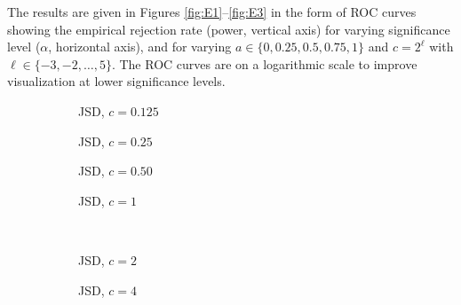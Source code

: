 \documentclass[oneside,11pt]{article}
\begin{document}
The results are given in Figures \ref{fig:E1}--\ref{fig:E3} in the form of ROC curves showing the empirical rejection rate (power, vertical axis) for varying significance level ($\alpha$, horizontal axis), and for varying $a\in\{0,0.25,0.5,0.75,1\}$ and $c=2^\ell$ with $\ell\in\{-3,-2,\ldots,5\}$. The ROC curves are on a logarithmic scale to improve visualization at lower significance levels.

\begin{figure}[htpb!]
    \centering
    \begin{subfigure}{0.25\textwidth}
        \centering
        \caption{\small JSD, $c=0.125$} \label{fig:E1:a0}
    \end{subfigure}%
    \begin{subfigure}{0.25\textwidth}
        \centering
        \caption{\small JSD, $c=0.25$} \label{fig:E1:a}
    \end{subfigure}%
    \begin{subfigure}{0.25\textwidth}
        \centering
        \caption{\small JSD, $c=0.50$} \label{fig:E1:b}
    \end{subfigure}%
    \begin{subfigure}{0.25\textwidth}
        \centering
        \caption{\small JSD, $c=1$} \label{fig:E1:c}
    \end{subfigure}\\
    \begin{subfigure}{0.25\textwidth}
        \centering
        \caption{\small JSD, $c=2$} \label{fig:E1:d}
    \end{subfigure}%
    \begin{subfigure}{0.25\textwidth}
        \centering
        \caption{\small JSD, $c=4$} \label{fig:E1:e}
    \end{subfigure}%
    \begin{subfigure}{0.25\textwidth}

\end{subfigure}
\end{figure}
\end{document}
